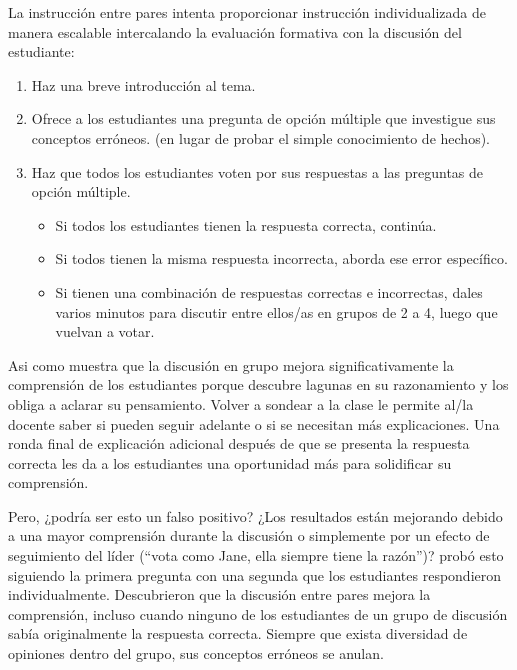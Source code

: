 La instrucción entre pares intenta proporcionar instrucción individualizada de manera escalable
intercalando la evaluación formativa con la discusión del estudiante:

\begin{enumerate}

\item
  Haz una breve introducción al tema.

\item
  Ofrece a los estudiantes una pregunta de opción múltiple que investigue sus conceptos erróneos.
  (en lugar de probar el simple conocimiento de hechos).

\item
  Haz que todos los estudiantes voten por sus respuestas a las preguntas de opción múltiple.

  \begin{itemize}

  \item
    Si todos los estudiantes tienen la respuesta correcta, continúa.

  \item
    Si todos tienen la misma respuesta incorrecta,
    aborda ese error específico.

  \item
    Si tienen una combinación de respuestas correctas e incorrectas,
    dales varios minutos para discutir entre ellos/as en grupos de 2 a 4,
    luego que vuelvan a votar.

  \end{itemize}

\end{enumerate}

Asi como
 muestra que
la discusión en grupo mejora significativamente la comprensión de los estudiantes
porque descubre lagunas en su razonamiento y los obliga a aclarar su pensamiento.
Volver a sondear a la clase le permite al/la docente saber si pueden seguir adelante
o si se necesitan más explicaciones.
Una ronda final de explicación adicional después de que se presenta la respuesta correcta
les da a los estudiantes una oportunidad más para solidificar su comprensión.

Pero, ¿podría ser esto un falso positivo?
¿Los resultados están mejorando debido a una mayor comprensión durante la discusión
o simplemente por un efecto de seguimiento del líder (``vota como Jane, ella siempre tiene la razón'')?
\cite{Smit2009} probó esto siguiendo la primera pregunta con una segunda
que los estudiantes respondieron individualmente.
Descubrieron que la discusión entre pares mejora la comprensión,
incluso cuando ninguno de los estudiantes de un grupo de discusión sabía originalmente la respuesta correcta.
Siempre que exista diversidad de opiniones dentro del grupo,
sus conceptos erróneos se anulan.

